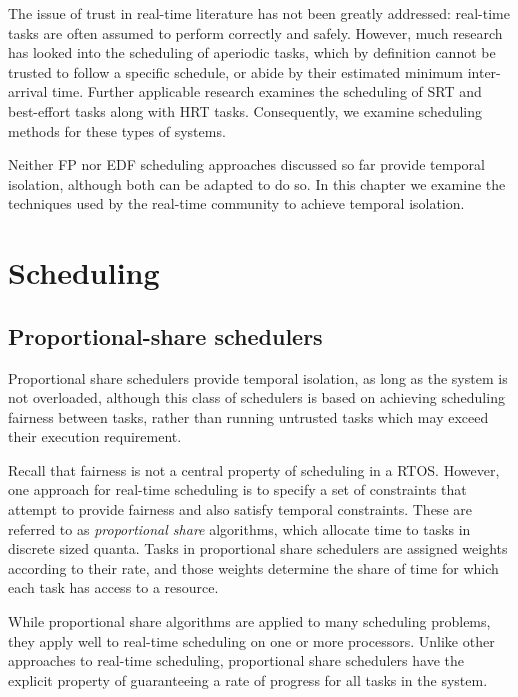 The issue of trust in real-time literature has not been greatly addressed: real-time tasks are often
assumed to perform correctly and safely.  However, much research has looked into the scheduling of
aperiodic tasks, which by definition cannot be trusted to follow a specific schedule, or abide by
their estimated minimum inter-arrival time. Further applicable research examines the scheduling of
\gls{SRT} and best-effort tasks along with \gls{HRT} tasks. Consequently, we examine scheduling methods for
these types of systems. 

Neither \gls{FP} nor \gls{EDF} scheduling
approaches discussed so far provide temporal isolation, although both can be adapted to do so.  In
this chapter we examine the techniques used by the real-time community to achieve temporal
isolation.

\section{Scheduling}


\subsection{Proportional-share schedulers}
\label{s:pfair}

Proportional share schedulers provide temporal isolation, as long as the system is not overloaded,
although this class of schedulers is based on achieving scheduling fairness between tasks, rather
than running untrusted tasks which may exceed their execution requirement. 

Recall that fairness is not a central property of scheduling in a \acrlong{RTOS}. However, one approach
for real-time scheduling is to specify a set of constraints that attempt to provide fairness and
also satisfy temporal constraints.  These are referred to as \emph{proportional share} algorithms,
which allocate time to tasks in discrete sized quanta. Tasks in proportional share schedulers are assigned 
weights according to their rate, and those weights determine the share of time for which each task 
has access to a resource.

While proportional share algorithms are applied to many scheduling problems, they apply
well to real-time scheduling on one or more processors.
Unlike other approaches to real-time scheduling, proportional share schedulers have the explicit property of guaranteeing a rate of progress for all tasks in the system.

